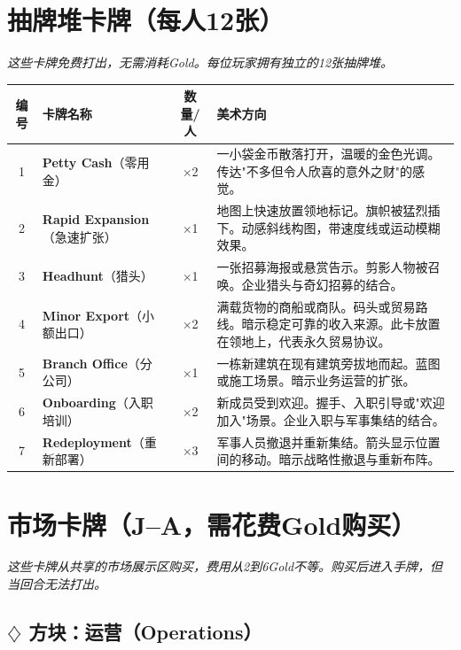 \documentclass[a4paper,11pt]{article}
\begin{document}
\newpage

\section{抽牌堆卡牌（每人12张）}

\textit{这些卡牌免费打出，无需消耗Gold。每位玩家拥有独立的12张抽牌堆。}

\begin{longtable}{@{} c p{2.8cm} c p{5.8cm} @{}}
\toprule
\textbf{编号} & \textbf{卡牌名称} & \textbf{数量/人} & \textbf{美术方向} \\
\midrule
\endhead
1 & \textbf{Petty Cash}（零用金） & $\times$2 & 一小袋金币散落打开，温暖的金色光调。传达"不多但令人欣喜的意外之财"的感觉。 \\
\midrule
2 & \textbf{Rapid Expansion}（急速扩张） & $\times$1 & 地图上快速放置领地标记。旗帜被猛烈插下。动感斜线构图，带速度线或运动模糊效果。 \\
\midrule
3 & \textbf{Headhunt}（猎头） & $\times$1 & 一张招募海报或悬赏告示。剪影人物被召唤。企业猎头与奇幻招募的结合。 \\
\midrule
4 & \textbf{Minor Export}（小额出口） & $\times$2 & 满载货物的商船或商队。码头或贸易路线。暗示稳定可靠的收入来源。此卡放置在领地上，代表永久贸易协议。 \\
\midrule
5 & \textbf{Branch Office}（分公司） & $\times$1 & 一栋新建筑在现有建筑旁拔地而起。蓝图或施工场景。暗示业务运营的扩张。 \\
\midrule
6 & \textbf{Onboarding}（入职培训） & $\times$2 & 新成员受到欢迎。握手、入职引导或"欢迎加入"场景。企业入职与军事集结的结合。 \\
\midrule
7 & \textbf{Redeployment}（重新部署） & $\times$3 & 军事人员撤退并重新集结。箭头显示位置间的移动。暗示战略性撤退与重新布阵。 \\
\bottomrule
\end{longtable}

\newpage

\section{市场卡牌（J--A，需花费Gold购买）}

\textit{这些卡牌从共享的市场展示区购买，费用从2到6Gold不等。购买后进入手牌，但当回合无法打出。}

\subsection*{$\diamondsuit$ 方块：运营（Operations）}
\end{document}
